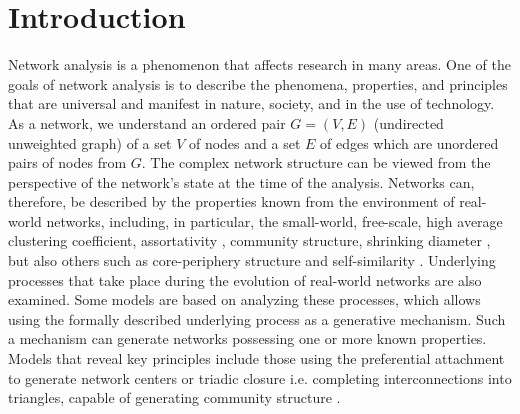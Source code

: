 \documentclass{sig-alternate-05-2015}
\begin{document}
\section{Introduction}
Network analysis is a phenomenon that affects research in many areas. One of the goals of network analysis is to describe the phenomena, properties, and principles that are universal and manifest in nature, society, and in the use of technology.
As a network, we understand an ordered pair $G = (V, E)$ (undirected unweighted graph) of a set $V$ of nodes and a set $E$ of edges which are unordered pairs of nodes from $G$.
The complex network structure can be viewed from the perspective of the network's state at the time of the analysis. Networks can, therefore, be described by the properties known from the environment of real-world networks, including, in particular, the small-world, free-scale, high average clustering coefficient, assortativity \cite{newman2002assortative}, community structure, shrinking diameter \cite{leskovec2005graphs}, but also others such as core-periphery structure \cite{rombach2014core} and self-similarity \cite{song2005self}. Underlying processes that take place during the evolution of real-world networks are also examined. Some models are based on analyzing these processes, which allows using the formally described underlying process as a generative mechanism. Such a mechanism can generate networks possessing one or more known properties. Models that reveal key principles include those using the preferential attachment to generate network centers \cite{albert2002statistical} or triadic closure i.e. completing interconnections into triangles, capable of generating community structure \cite{bianconi2014triadic}.
\end{document}
